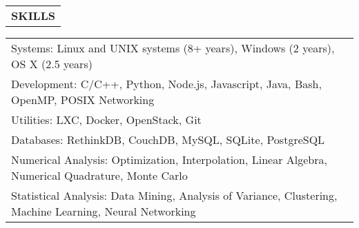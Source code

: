 \begin{tabularx}{\textwidth}{ L }
  \textbf{SKILLS} \\
\end{tabularx}
\begin{small}
\begin{tabularx}{\textwidth}{ L }
    Systems: Linux and UNIX systems (8+ years), Windows (2 years), OS X (2.5 years) \\
    Development: C/C++, Python, Node.js, Javascript, Java, Bash, OpenMP, POSIX Networking \\
    Utilities: LXC, Docker, OpenStack, Git \\
    Databases: RethinkDB, CouchDB, MySQL, SQLite, PostgreSQL \\
    Numerical Analysis: Optimization, Interpolation, Linear Algebra, Numerical Quadrature, Monte Carlo \\
    Statistical Analysis: Data Mining, Analysis of Variance, Clustering, Machine Learning, Neural Networking \\
\end{tabularx}
\end{small}
